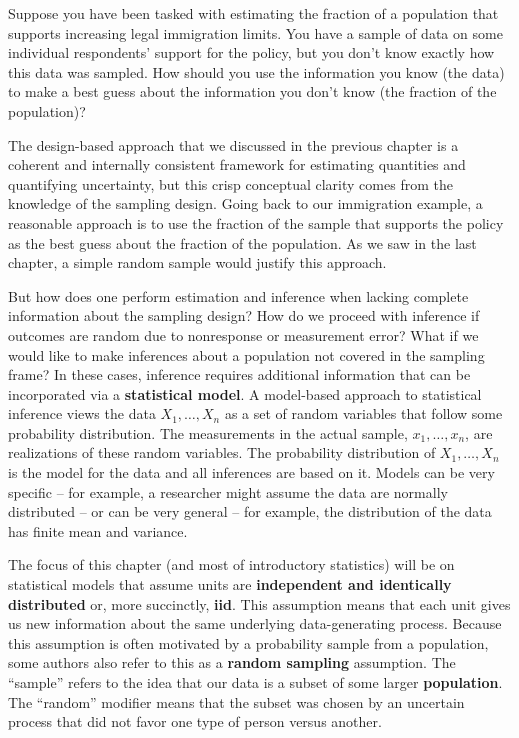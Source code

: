 \documentclass[
  letterpaper,
  DIV=11,
  numbers=noendperiod]{scrreprt}
\theoremstyle{definition}
\theoremstyle{definition}
\theoremstyle{plain}
\theoremstyle{remark}
\begin{document}
Suppose you have been tasked with estimating the fraction of a
population that supports increasing legal immigration limits. You have a
sample of data on some individual respondents' support for the policy,
but you don't know exactly how this data was sampled. How should you use
the information you know (the data) to make a best guess about the
information you don't know (the fraction of the population)?

The design-based approach that we discussed in the previous chapter is a
coherent and internally consistent framework for estimating quantities
and quantifying uncertainty, but this crisp conceptual clarity comes
from the knowledge of the sampling design. Going back to our immigration
example, a reasonable approach is to use the fraction of the sample that
supports the policy as the best guess about the fraction of the
population. As we saw in the last chapter, a simple random sample would
justify this approach.

But how does one perform estimation and inference when lacking complete
information about the sampling design? How do we proceed with inference
if outcomes are random due to nonresponse or measurement error? What if
we would like to make inferences about a population not covered in the
sampling frame? In these cases, inference requires additional
information that can be incorporated via a \textbf{statistical model}. A
model-based approach to statistical inference views the data
\(X_1,\ldots, X_n\) as a set of random variables that follow some
probability distribution. The measurements in the actual sample,
\(x_1, \ldots, x_n\), are realizations of these random variables. The
probability distribution of \(X_1,\ldots, X_n\) is the model for the
data and all inferences are based on it. Models can be very specific --
for example, a researcher might assume the data are normally distributed
-- or can be very general -- for example, the distribution of the data
has finite mean and variance.

The focus of this chapter (and most of introductory statistics) will be
on statistical models that assume units are \textbf{independent and
identically distributed} or, more succinctly, \textbf{iid}. This
assumption means that each unit gives us new information about the same
underlying data-generating process. Because this assumption is often
motivated by a probability sample from a population, some authors also
refer to this as a \textbf{random sampling} assumption. The ``sample''
refers to the idea that our data is a subset of some larger
\textbf{population}. The ``random'' modifier means that the subset was
chosen by an uncertain process that did not favor one type of person
versus another.
\end{document}
